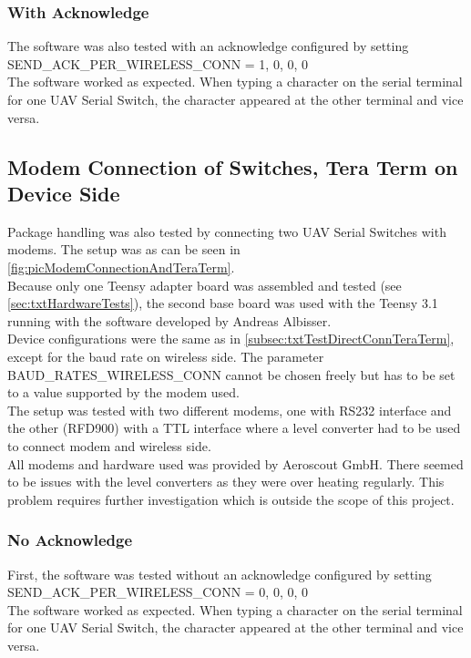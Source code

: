 \subsubsection{With Acknowledge}
The software was also tested with an acknowledge configured by setting SEND\_ACK\_PER\_WIRELESS\_CONN = 1, 0, 0, 0\\
The software worked as expected. When typing a character on the serial terminal for one UAV Serial Switch, the character appeared at the other terminal and vice versa.
%
%
\subsection{Modem Connection of Switches, Tera Term on Device Side} 
%
Package handling was also tested by connecting two UAV Serial Switches with modems. The setup was as can be seen in \autoref{fig:picModemConnectionAndTeraTerm}.\\
Because only one Teensy adapter board was assembled and tested (see \autoref{sec:txtHardwareTests}), the second base board was used with the Teensy 3.1 running with the software developed by Andreas Albisser.\\
Device configurations were the same as in \autoref{subsec:txtTestDirectConnTeraTerm}, except for the baud rate on wireless side. The parameter BAUD\_RATES\_WIRELESS\_CONN cannot be chosen freely but has to be set to a value supported by the modem used.\\
The setup was tested with two different modems, one with RS232 interface and the other (RFD900) with a TTL interface where a level converter had to be used to connect modem and wireless side.\\
All modems and hardware used was provided by Aeroscout GmbH. There seemed to be issues with the level converters as they were over heating regularly. This problem  requires further investigation which is outside the scope of this project.
%
\subsubsection{No Acknowledge}
First, the software was tested without an acknowledge configured by setting SEND\_ACK\_PER\_WIRELESS\_CONN = 0, 0, 0, 0\\
The software worked as expected. When typing a character on the serial terminal for one UAV Serial Switch, the character appeared at the other terminal and vice versa.
%
